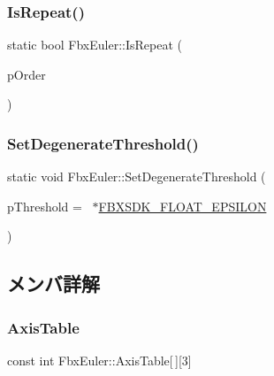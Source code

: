 \mbox{\label{class_fbx_euler_a6f668dbfcefeee76a9668aafd3b53e45}} 
\subsubsection{\texorpdfstring{Is\+Repeat()}{IsRepeat()}}
{\footnotesize\ttfamily static bool Fbx\+Euler\+::\+Is\+Repeat (\begin{DoxyParamCaption}\item[{\hyperlink{class_fbx_euler_a7d5bec7eedb022b4dae56894ab7a9939}{E\+Order}}]{p\+Order }\end{DoxyParamCaption})\hspace{0.3cm}{\ttfamily [static]}}

\mbox{\label{class_fbx_euler_aea5f70a2534b0f5353a97aec02d9bafc}} 
\subsubsection{\texorpdfstring{Set\+Degenerate\+Threshold()}{SetDegenerateThreshold()}}
{\footnotesize\ttfamily static void Fbx\+Euler\+::\+Set\+Degenerate\+Threshold (\begin{DoxyParamCaption}\item[{double}]{p\+Threshold = {~$\ast$\hyperlink{fbxtypes_8h_a11f9f828046657bad7afc23f591f2052}{F\+B\+X\+S\+D\+K\+\_\+\+F\+L\+O\+A\+T\+\_\+\+E\+P\+S\+I\+L\+ON}} }\end{DoxyParamCaption})\hspace{0.3cm}{\ttfamily [static]}}



\subsection{メンバ詳解}
\mbox{\label{class_fbx_euler_aa75edcd96f3a7432c31b09869051635d}} 
\subsubsection{\texorpdfstring{Axis\+Table}{AxisTable}}
{\footnotesize\ttfamily const int Fbx\+Euler\+::\+Axis\+Table\mbox{[}$\,$\mbox{]}\mbox{[}3\mbox{]}\hspace{0.3cm}{\ttfamily [static]}}



